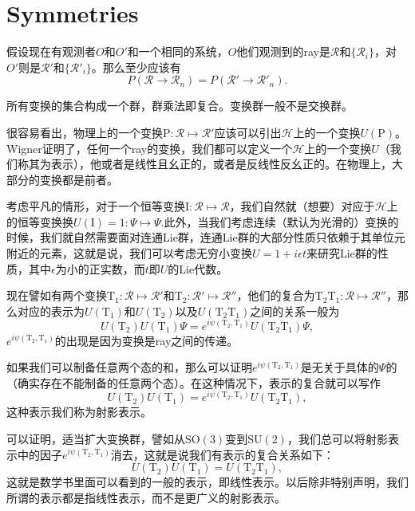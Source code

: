 \section{Symmetries}

假设现在有观测者$O$和$O'$和一个相同的系统，$O$他们观测到的ray是$\mathscr{R}$和$\{\mathscr{R}_i\}$，对$O'$则是$\mathscr{R}'$和$\{\mathscr{R}'_i\}$。那么至少应该有
\[
P(\mathscr{R}\to\mathscr{R}_n)=P(\mathscr{R}'\to\mathscr{R}'_n).
\]

所有变换的集合构成一个群，群乘法即复合。变换群一般不是交换群。

很容易看出，物理上的一个变换$\mathrm{P}:\mathscr{R} \mapsto \mathscr{R}'$应该可以引出$\mathcal{H}$上的一个变换$U(\mathrm{P})$。Wigner证明了，任何一个ray的变换，我们都可以定义一个$\mathcal{H}$上的一个变换$U$（我们称其为表示），他或者是线性且幺正的，或者是反线性反幺正的。在物理上，大部分的变换都是前者。

考虑平凡的情形，对于一个恒等变换$\mathrm{I}:\mathscr{R} \mapsto \mathscr{R}$，我们自然就（想要）对应于$\mathcal{H}$上的恒等变换换$U(\mathrm{I})=1:\Psi\mapsto \Psi$.此外，当我们考虑连续（默认为光滑的）变换的时候，我们就自然需要面对连通Lie群，连通Lie群的大部分性质只依赖于其单位元附近的元素，这就是说，我们可以考虑无穷小变换$U=1+i\epsilon t$来研究Lie群的性质，其中$\epsilon$为小的正实数，而$t$即$U$的Lie代数。

现在譬如有两个变换$\mathrm{T}_1:\mathscr{R}\mapsto \mathscr{R}'$和$\mathrm{T}_2:\mathscr{R}'\mapsto \mathscr{R}''$，他们的复合为$\mathrm{T}_2\mathrm{T}_1:\mathscr{R}\mapsto \mathscr{R}''$，那么对应的表示为$U(\mathrm{T}_1)$和$U(\mathrm{T}_2)$以及$U(\mathrm{T}_2\mathrm{T}_1)$之间的关系一般为
\[
U(\mathrm{T}_2)U(\mathrm{T}_1)\Psi=e^{i\psi(\mathrm{T}_2,\mathrm{T}_1)}U(\mathrm{T}_2\mathrm{T}_1)\Psi,
\]
$e^{i\psi(\mathrm{T}_2,\mathrm{T}_1)}$的出现是因为变换是ray之间的传递。

如果我们可以制备任意两个态的和，那么可以证明$e^{i\psi(\mathrm{T}_2,\mathrm{T}_1)}$是无关于具体的$\Psi$的（确实存在不能制备的任意两个态）。在这种情况下，表示的复合就可以写作
\[
U(\mathrm{T}_2)U(\mathrm{T}_1)=e^{i\psi(\mathrm{T}_2,\mathrm{T}_1)}U(\mathrm{T}_2\mathrm{T}_1),
\]
这种表示我们称为射影表示。

可以证明，适当扩大变换群，譬如从$\mathrm{SO}(3)$变到$\mathrm{SU}(2)$，我们总可以将射影表示中的因子$e^{i\psi(\mathrm{T}_2,\mathrm{T}_1)}$消去，这就是说我们有表示的复合关系如下：
\[
U(\mathrm{T}_2)U(\mathrm{T}_1)=U(\mathrm{T}_2\mathrm{T}_1),
\]
这就是数学书里面可以看到的一般的表示，即线性表示。以后除非特别声明，我们所谓的表示都是指线性表示，而不是更广义的射影表示。

